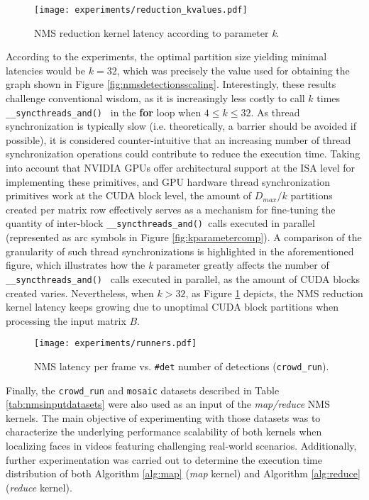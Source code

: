 \begin{figure}[t]
  \centering
  \texttt{[image: experiments/reduction\_kvalues.pdf]}
  \caption{\label{fig:nmskparametergraph} NMS reduction kernel latency according to parameter \emph{k}.}
\end{figure}

According to the experiments, the optimal partition size yielding minimal latencies would be $k = 32$, which was precisely the value used for 
obtaining the graph shown in Figure \ref{fig:nmsdetectionsscaling}. Interestingly, these results challenge 
conventional wisdom, as it is increasingly less costly to call $k$ times \small\texttt{\_\_syncthreads\_and() }\normalsize 
 in the \textbf{for} loop when $4 \leq k \leq 32$. As thread synchronization is typically slow (i.e. theoretically, a barrier should be avoided 
if possible), it is considered counter-intuitive that an increasing number of thread synchronization operations could contribute to reduce the 
execution time. Taking into account that NVIDIA GPUs offer architectural support at the ISA level for implementing these primitives, and GPU hardware thread 
synchronization primitives work at the CUDA block level, the amount of $D_{max} / k$ partitions created per matrix row effectively serves as a 
mechanism for fine-tuning the quantity of inter-block \small\texttt{\_\_syncthreads\_and() }\normalsize calls executed in parallel (represented 
as arc symbols in Figure \ref{fig:kparametercomp}). A comparison of the granularity of such thread synchronizations is highlighted in the  
aforementioned figure, which illustrates how the \emph{k} parameter greatly affects the number of \small\texttt{\_\_syncthreads\_and() }\normalsize 
calls executed in parallel, as the amount of CUDA blocks created varies. Nevertheless, when $k > 32$, as Figure \ref{fig:nmskparametergraph} depicts, 
the NMS reduction kernel latency keeps growing due to unoptimal CUDA block partitions when processing the input matrix $B$.

\begin{figure}[t]
  \centering
  \texttt{[image: experiments/runners.pdf]}
  \caption{\label{fig:crowdrungraph} NMS latency per frame vs. \texttt{\#det} number of detections (\texttt{crowd\_run}).}
\end{figure} 

Finally, the \texttt{crowd\_run} and \texttt{mosaic} datasets described in Table \ref{tab:nmsinputdatasets} were also used as an input of the 
\emph{map/reduce} NMS kernels. The main objective of experimenting with those datasets was to characterize the underlying performance scalability 
of both kernels when localizing faces in videos featuring challenging real-world scenarios. Additionally, further experimentation was carried out 
to determine the execution time distribution of both Algorithm \ref{alg:map} (\emph{map} kernel) and Algorithm \ref{alg:reduce} (\emph{reduce} kernel).

